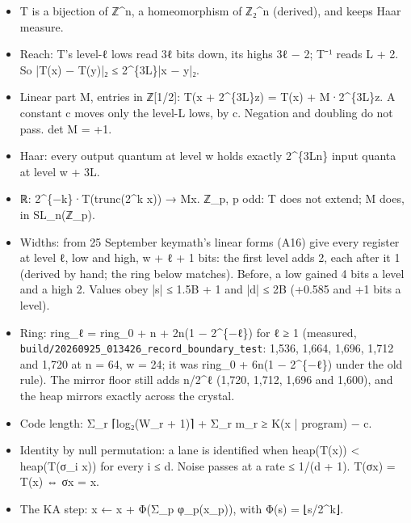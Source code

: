 \begin{itemize}
\begin{itemize}
\item T is a bijection of ℤ\textasciicircum{}n, a homeomorphism of ℤ₂\textasciicircum{}n (derived), and keeps Haar measure.
\item Reach: T's level-ℓ lows read 3ℓ bits down, its highs 3ℓ − 2; T⁻¹ reads L + 2. So |T(x) − T(y)|₂ ≤ 2\textasciicircum{}\{3L\}|x − y|₂.
\item Linear part M, entries in ℤ[1/2]: T(x + 2\textasciicircum{}\{3L\}z) = T(x) + M·2\textasciicircum{}\{3L\}z. A constant c moves only the level-L lows, by c. Negation and doubling do not pass. det M = +1.
\item Haar: every output quantum at level w holds exactly 2\textasciicircum{}\{3Ln\} input quanta at level w + 3L.
\item ℝ: 2\textasciicircum{}\{−k\}·T(trunc(2\textasciicircum{}k x)) → Mx. ℤ\_\allowbreak{}p, p odd: T does not extend; M does, in SL\_\allowbreak{}n(ℤ\_\allowbreak{}p).
\item Widths: from 25 September keymath's linear forms (A16) give every register at level ℓ, low and high, w + ℓ + 1 bits: the first level adds 2, each after it 1 (derived by hand; the ring below matches). Before, a low gained 4 bits a level and a high 2. Values obey |s| ≤ 1.5B + 1 and |d| ≤ 2B (+0.585 and +1 bits a level).
\item Ring: ring\_\allowbreak{}ℓ = ring\_\allowbreak{}0 + n + 2n(1 − 2\textasciicircum{}\{−ℓ\}) for ℓ ≥ 1 (measured, \texttt{build/\allowbreak{}20260925\_\allowbreak{}013426\_\allowbreak{}record\_\allowbreak{}boundary\_\allowbreak{}test}: 1,536, 1,664, 1,696, 1,712 and 1,720 at n = 64, w = 24; it was ring\_\allowbreak{}0 + 6n(1 − 2\textasciicircum{}\{−ℓ\}) under the old rule). The mirror floor still adds n/2\textasciicircum{}ℓ (1,720, 1,712, 1,696 and 1,600), and the heap mirrors exactly across the crystal.
\item Code length: Σ\_\allowbreak{}r ⌈log₂(W\_\allowbreak{}r + 1)⌉ + Σ\_\allowbreak{}r m\_\allowbreak{}r ≥ K(x | program) − c.
\item Identity by null permutation: a lane is identified when heap(T(x)) < heap(T(σ\_\allowbreak{}i x)) for every i ≤ d. Noise passes at a rate ≤ 1/(d + 1). T(σx) = T(x) ⇔ σx = x.
\item The KA step: x ← x + Φ(Σ\_\allowbreak{}p φ\_\allowbreak{}p(x\_\allowbreak{}p)), with Φ(s) = ⌊s/2\textasciicircum{}k⌋.

\end{itemize}
\end{itemize}
